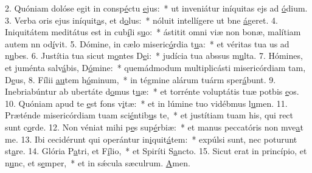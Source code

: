 2. Quóniam dolóse egit in consp\uline{é}ctu \uline{e}jus:~* ut inveniátur iníquitas ejs ad \uline{ó}dium.
3. Verba oris ejus iníquit\uline{a}s, et d\uline{o}lus:~* nóluit intellígere ut bne \uline{á}geret.
4. Iniquitátem meditátus est in cub\uline{í}li s\uline{u}o:~* ástitit omni viæ non bonæ, malítiam autem nn od\uline{í}vit.
5. Dómine, in cælo miseric\uline{ó}rdia t\uline{u}a:~* et véritas tua us ad n\uline{u}bes.
6. Justítia tua sicut m\uline{o}ntes D\uline{e}i:~* judícia tua abssus m\uline{u}lta.
7. Hómines, et juménta salv\uline{á}bis, D\uline{ó}mine:~* quemádmodum multiplicásti misericórdiam tam, D\uline{e}us,
8. Fílii \uline{au}tem h\uline{ó}minum,~* in tégmine alárum tuárm sper\uline{á}bunt.
9. Inebriabúntur ab ubertáte d\uline{o}mus t\uline{u}æ:~* et torrénte voluptátis tuæ potbis \uline{e}os.
10. Quóniam apud te \uline{e}st fons v\uline{i}tæ:~* et in lúmine tuo vidébmus l\uline{u}men.
11. Præténde misericórdiam tuam sci\uline{é}ntib\uline{u}s te,~* et justítiam tuam his, qui rect sunt c\uline{o}rde.
12. Non véniat mihi p\uline{e}s sup\uline{é}rbiæ:~* et manus peccatóris non mve\uline{a}t me.
13. Ibi cecidérunt qui operántur in\uline{i}quit\uline{á}tem:~* expúlsi sunt, nec poturunt st\uline{a}re.
14. Glória P\uline{a}tri, et F\uline{í}lio,~* et Spiríti S\uline{a}ncto.
15. Sicut erat in princípio, et n\uline{u}nc, et s\uline{e}mper,~* et in sǽcula sæculrum. \uline{A}men.
